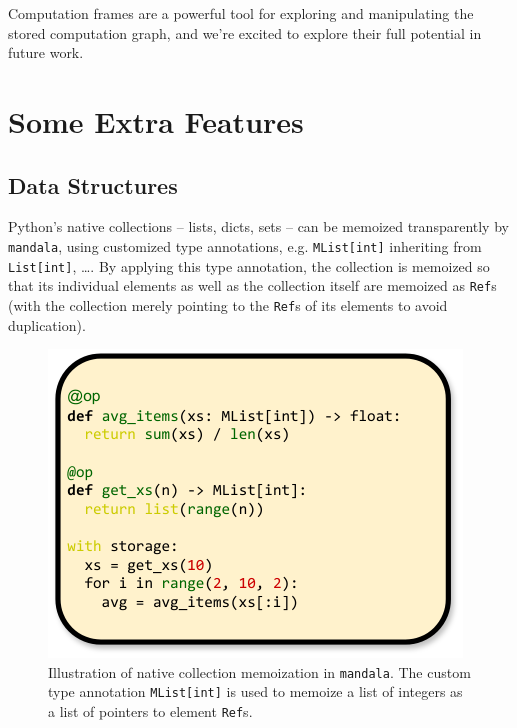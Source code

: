 \documentclass{article} %
\begin{document}
Computation frames are a powerful tool for exploring and manipulating the stored
computation graph, and we're excited to explore their full potential in future
work.

\section{Some Extra Features}
\label{section:extra-features}

\subsection{Data Structures}
\label{subsection:}

Python's native collections -- lists, dicts, sets -- can be memoized
transparently by \texttt{mandala}, using customized type annotations, e.g.
\texttt{MList[int]} inheriting from \texttt{List[int]}, \ldots. By applying this
type annotation, the collection is memoized so that its individual elements as
well as the collection itself are memoized as \texttt{Ref}s (with the collection
merely pointing to the \texttt{Ref}s of its elements to avoid duplication). 

\begin{figure}
    \centering
    \includegraphics[width=\linewidth]{img/list.pdf}
    \caption{Illustration of native collection memoization in \texttt{mandala}.
    The custom type annotation \texttt{MList[int]} is used to memoize a list of
    integers as a list of pointers to element \texttt{Ref}s.}
    \label{fig:list}
\end{figure}
\end{document}
